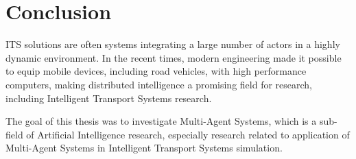 \documentclass[titlepage, 12pt]{article}
\begin{document}






\clearpage

\section{Conclusion}

ITS solutions are often systems integrating a large number of 
actors in a highly dynamic environment. In the recent times, modern engineering made it possible 
to equip mobile devices, including road vehicles, with high performance computers, making 
distributed intelligence a promising field for research, including Intelligent Transport Systems 
research.

The goal of this thesis was to investigate Multi-Agent Systems, which is a sub-field of Artificial Intelligence 
research, especially research related to application of Multi-Agent Systems in Intelligent Transport Systems 
simulation. 

\printbibliography
\end{document}
